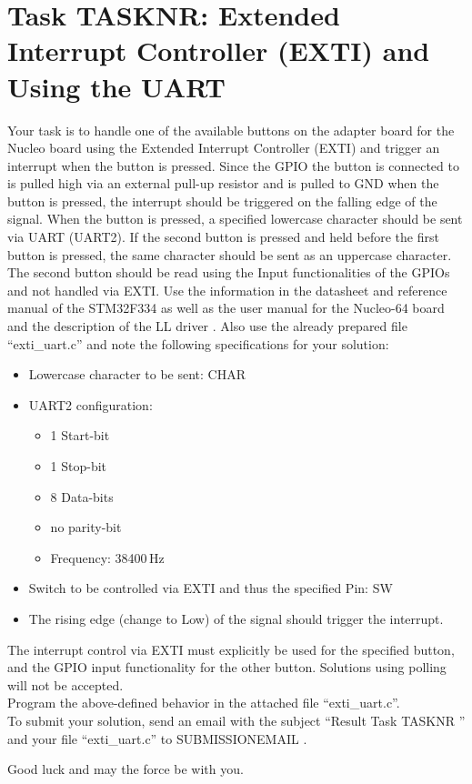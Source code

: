 \documentclass[a4paper,12pt]{article}
\begin{document}
\pagestyle{empty}
\setlength{\parindent}{0em}
\section{Task {{TASKNR}}: Extended Interrupt Controller (EXTI) and Using the UART}

Your task is to handle one of the available buttons on the adapter board for the Nucleo board using the Extended Interrupt Controller (EXTI) and trigger an interrupt when the button is pressed. Since the GPIO the button is connected to is pulled high via an external pull-up resistor and is pulled to GND when the button is pressed, the interrupt should be triggered on the falling edge of the signal. When the button is pressed, a specified lowercase character should be sent via UART (UART2). If the second button is pressed and held before the first button is pressed, the same character should be sent as an uppercase character. The second button should be read using the Input functionalities of the GPIOs and not handled via EXTI. Use the information in the datasheet \cite{data_sheet} and reference manual \cite{ref_manual} of the STM32F334 as well as the user manual for the Nucleo-64 board \cite{nucleo_manual} and the description of the LL driver \cite{driver_manual}. Also use the already prepared file \enquote{exti\_uart.c} and note the following specifications for your solution:

\begin{itemize}
\item Lowercase character to be sent: {{CHAR}}
\item UART2 configuration:
\begin{itemize}
    \item 1 Start-bit
    \item 1 Stop-bit
    \item 8 Data-bits
    \item no parity-bit
    \item Frequency: 38400\,Hz 
\end{itemize}
\item Switch to be controlled via EXTI and thus the specified Pin: {{SW}}
\item The rising edge (change to Low) of the signal should trigger the interrupt.
\end{itemize}
\vspace{0.3cm}

The interrupt control via EXTI must explicitly be used for the specified button, and the GPIO input functionality for the other button. Solutions using polling will not be accepted.
\\

Program the above-defined behavior in the attached file \enquote{exti\_uart.c}.
\\

To submit your solution, send an email with the subject \enquote{Result Task {{ TASKNR }}} and your file \enquote{exti\_uart.c} to {{ SUBMISSIONEMAIL }}.

\vspace{0.7cm}

Good luck and may the force be with you.

\newpage
\printbibliography[heading=bibintoc]
\end{document}

